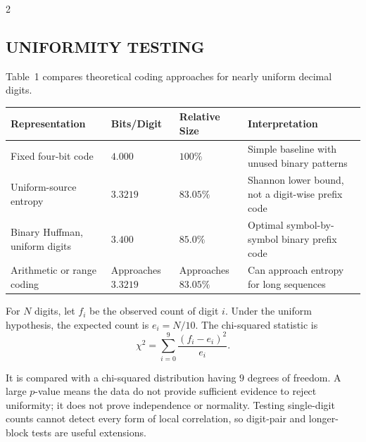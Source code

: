 \begin{multicols}{2}
  \subsection*{\centering\uppercase{Uniformity Testing}}
  Table~1 compares theoretical coding approaches for nearly uniform decimal digits.
\begin{center}
\vspace{-0.5em}
\begin{minipage}{0.98\columnwidth}
\centering
    \scriptsize
    \setlength{\tabcolsep}{2pt}
    \renewcommand{\arraystretch}{1.3}
    \begin{tabular}{@{}>{\RaggedRight\arraybackslash}p{}
                        >{\Centering\arraybackslash}p{}
                        >{\Centering\arraybackslash}p{}
                        >{\RaggedRight\arraybackslash}p{}@{}}
      \toprule
      \textbf{Representation} & \textbf{Bits/Digit} & \textbf{Relative Size} & \textbf{Interpretation} \\
      \midrule
      Fixed four-bit code & $4.000$ & $100\%$ & Simple baseline with unused binary patterns \\
      Uniform-source entropy & $3.3219$ & $83.05\%$ & Shannon lower bound, not a digit-wise prefix code \\
      Binary Huffman, uniform digits & $3.400$ & $85.0\%$ & Optimal symbol-by-symbol binary prefix code \\
      Arithmetic or range coding & Approaches $3.3219$ & Approaches $83.05\%$ & Can approach entropy for long sequences \\
      \bottomrule
    \end{tabular}
\end{minipage}
  \end{center}
  For $N$ digits, let $f_i$ be the observed count of digit $i$. Under the uniform hypothesis, the expected count is $e_i=N/10$. The chi-squared statistic is
  \[
    \chi^2=\sum_{i=0}^{9}\frac{(f_i-e_i)^2}{e_i}.
  \]


\vspace{-0.35em}

  It is compared with a chi-squared distribution having $9$ degrees of freedom. A large $p$-value means the data do not provide sufficient evidence to reject uniformity; it does not prove independence or normality. Testing single-digit counts cannot detect every form of local correlation, so digit-pair and longer-block tests are useful extensions.


\end{multicols}
